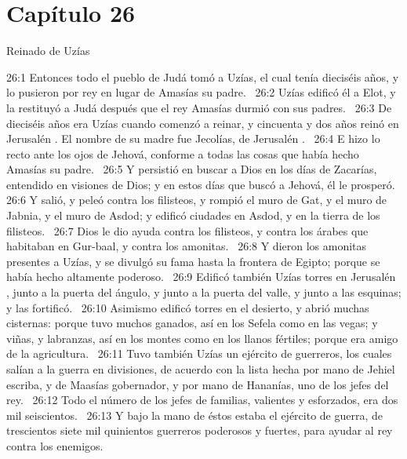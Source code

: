 																									\section*{Capítulo 26}
																										Reinado de Uzías  
																										
																										
																										26:1 Entonces todo el pueblo de Judá tomó a Uzías, el cual tenía dieciséis años, y lo pusieron por rey en lugar de Amasías su padre.  
																										26:2 Uzías edificó él a Elot, y la restituyó a Judá después que el rey Amasías durmió con sus padres.  
																										26:3 De dieciséis años era Uzías cuando comenzó a reinar, y cincuenta y dos años reinó en Jerusalén . El nombre de su madre fue Jecolías, de Jerusalén .  
																										26:4 E hizo lo recto ante los ojos de Jehová, conforme a todas las cosas que había hecho Amasías su padre.  
																										26:5 Y persistió en buscar a Dios en los días de Zacarías, entendido en visiones de Dios; y en estos días que buscó a Jehová, él le prosperó.  
																										26:6 Y salió, y peleó contra los filisteos, y rompió el muro de Gat, y el muro de Jabnia, y el muro de Asdod; y edificó ciudades en Asdod, y en la tierra de los filisteos.  
																										26:7 Dios le dio ayuda contra los filisteos, y contra los árabes que habitaban en Gur-baal, y contra los amonitas.  
																										26:8 Y dieron los amonitas presentes a Uzías, y se divulgó su fama hasta la frontera de Egipto; porque se había hecho altamente poderoso.  
																										26:9 Edificó también Uzías torres en Jerusalén , junto a la puerta del ángulo, y junto a la puerta del valle, y junto a las esquinas; y las fortificó.  
																										26:10 Asimismo edificó torres en el desierto, y abrió muchas cisternas: porque tuvo muchos ganados, así en los Sefela como en las vegas; y viñas, y labranzas, así en los montes como en los llanos fértiles; porque era amigo de la agricultura.  
																										26:11 Tuvo también Uzías un ejército de guerreros, los cuales salían a la guerra en divisiones, de acuerdo con la lista hecha por mano de Jehiel escriba, y de Maasías gobernador, y por mano de Hananías, uno de los jefes del rey.  
																										26:12 Todo el número de los jefes de familias, valientes y esforzados, era dos mil seiscientos.  
																										26:13 Y bajo la mano de éstos estaba el ejército de guerra, de trescientos siete mil quinientos guerreros poderosos y fuertes, para ayudar al rey contra los enemigos.  
